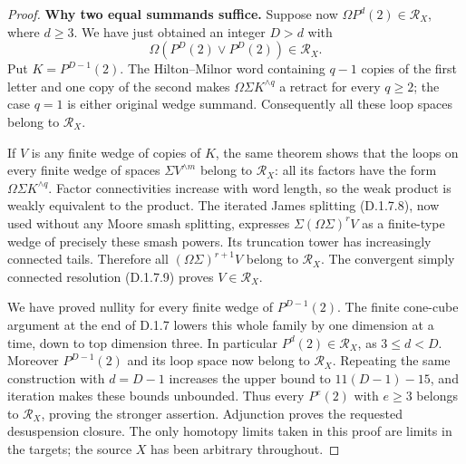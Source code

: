 \begin{proof}
\medskip\noindent
\textbf{Why two equal summands suffice.}
Suppose now $\Omega P^d(2)\in\mathcal R_X$, where $d\geq3$.
We have just obtained an integer $D>d$ with
\[
       \Omega(P^D(2)\vee P^D(2))\in\mathcal R_X.
\]
Put $K=P^{D-1}(2)$. The Hilton--Milnor word containing $q-1$
copies of the first letter and one copy of the second makes
$\Omega\Sigma K^{\wedge q}$ a retract for every $q\geq2$;
the case $q=1$ is either original wedge summand. Consequently
all these loop spaces belong to $\mathcal R_X$.

If $V$ is any finite wedge of copies of $K$, the same theorem
shows that the loops on every finite wedge of spaces
$\Sigma V^{\wedge m}$ belong to $\mathcal R_X$: all its factors
have the form $\Omega\Sigma K^{\wedge q}$. Factor connectivities
increase with word length, so the weak product is weakly
equivalent to the product. The iterated James splitting
(D.1.7.8), now used without any Moore smash splitting, expresses
$\Sigma(\Omega\Sigma)^rV$ as a finite-type wedge of precisely
these smash powers. Its truncation tower has increasingly
connected tails. Therefore all
$(\Omega\Sigma)^{r+1}V$ belong to $\mathcal R_X$.
The convergent simply connected resolution (D.1.7.9) proves
$V\in\mathcal R_X$.

We have proved nullity for every finite wedge of $P^{D-1}(2)$.
The finite cone-cube argument at the end of D.1.7 lowers this
whole family by one dimension at a time, down to top dimension
three. In particular $P^d(2)\in\mathcal R_X$, as $3\leq d<D$.
Moreover $P^{D-1}(2)$ and its loop space now belong to
$\mathcal R_X$. Repeating the same construction with $d=D-1$
increases the upper bound to $11(D-1)-15$, and iteration makes
these bounds unbounded. Thus every $P^e(2)$ with $e\geq3$
belongs to $\mathcal R_X$, proving the stronger assertion.
Adjunction proves the requested desuspension closure. The only
homotopy limits taken in this proof are limits in the targets;
the source $X$ has been arbitrary throughout.
\end{proof}

